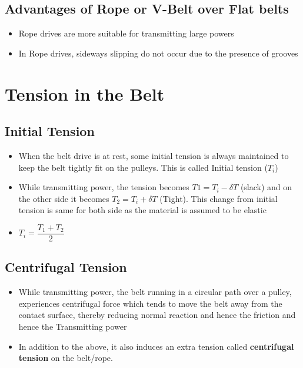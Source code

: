 \documentclass[8pt]{report}
\begin{document}
\subsection{Advantages of Rope or V-Belt over Flat belts}
	\begin{itemize}
		\item Rope drives are more suitable for transmitting large powers
		\item In Rope drives, sideways slipping do not occur due to the presence of grooves
	\end{itemize}\hrulefill
\section{Tension in the Belt}
\subsection{Initial Tension}
	\begin{itemize}
		\item When the belt drive is at rest, some initial tension is always maintained to keep the belt tightly fit on the pulleys. This is called Initial tension ($T_i$)
		\item While transmitting power, the tension becomes $T1=T_i-\delta T$ (slack) and on the other side it becomes $T_2=T_i+\delta T$ (Tight). This change from initial tension is same for both side as the material is assumed to be elastic
		\item $\boxed{T_i=\dfrac{T_1+T_2}{2}}$
	\end{itemize}\hrulefill
\subsection{Centrifugal Tension}
	\begin{itemize}
		\item While transmitting power, the belt running in a circular path over a pulley, experiences centrifugal force which tends to move the belt away from the contact surface, thereby reducing normal reaction and hence the friction and hence the Transmitting power
		\item In addition to the above, it also induces an extra tension called \textbf{centrifugal tension} on the belt/rope.
		
	\end{itemize}
\end{document}
